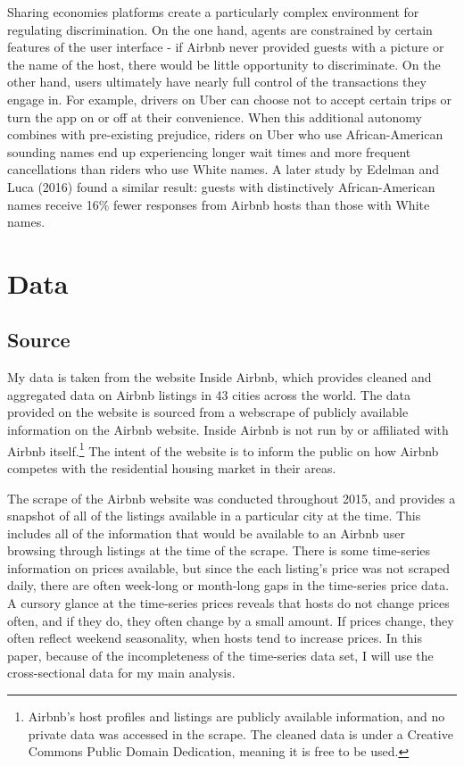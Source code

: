 \documentclass[11pt, oneside]{article}
\begin{document}
Sharing economies platforms create a particularly complex environment for regulating discrimination. On the one hand, agents are constrained by certain features of the user interface - if Airbnb never provided guests with a picture or the name of the host, there would be little opportunity to discriminate. On the other hand, users ultimately have nearly full control of the transactions they engage in. For example, drivers on Uber can choose not to accept certain trips or turn the app on or off at their convenience. When this additional autonomy combines with pre-existing prejudice, riders on Uber who use African-American sounding names end up experiencing longer wait times and more frequent cancellations than riders who use White names.\cite{knittel} A later study by Edelman and Luca (2016) found a similar result: guests with distinctively African-American names receive 16\% fewer responses from Airbnb hosts than those with White names.\cite{edelman2} 

 


\section{Data}
\subsection{Source} %

My data is taken from the website Inside Airbnb, which provides cleaned and aggregated data on Airbnb listings in 43 cities across the world.\cite{insideairbnb} The data provided on the website is sourced from a webscrape of publicly available information on the Airbnb website. Inside Airbnb is not run by or affiliated with Airbnb itself.\footnote{Airbnb's host profiles and listings are publicly available information, and no private data was accessed in the scrape. The cleaned data is under a Creative Commons Public Domain Dedication, meaning it is free to be used.} The intent of the website is to inform the public on how Airbnb competes with the residential housing market in their areas. 

The scrape of the Airbnb website was conducted throughout 2015, and provides a snapshot of all of the listings available in a particular city at the time. This includes all of the information that would be available to an Airbnb user browsing through listings at the time of the scrape. There is some time-series information on prices available, but since the each listing's price was not scraped daily, there are often week-long or month-long gaps in the time-series price data. A cursory glance at the time-series prices reveals that hosts do not change prices often, and if they do, they often change by a small amount. If prices change, they often reflect weekend seasonality, when hosts tend to increase prices. In this paper, because of the incompleteness of the time-series data set, I will use the cross-sectional data for my main analysis.  
\end{document}

